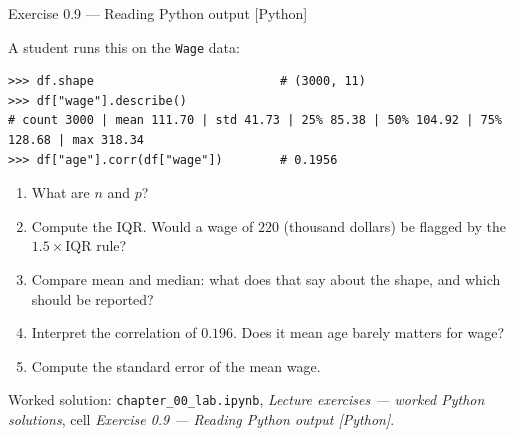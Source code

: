 \documentclass[aspectratio=169,11pt]{beamer}
\begin{document}
\begin{frame}[fragile]{Exercise 0.9 --- Reading Python output [Python]}
  \begin{exercise}
    \scriptsize
    A student runs this on the \texttt{Wage} data:
\begin{lstlisting}[basicstyle=\ttfamily\scriptsize,aboveskip=3pt,belowskip=1pt]
>>> df.shape                          # (3000, 11)
>>> df["wage"].describe()
# count 3000 | mean 111.70 | std 41.73 | 25% 85.38 | 50% 104.92 | 75% 128.68 | max 318.34
>>> df["age"].corr(df["wage"])        # 0.1956
\end{lstlisting}
    \begin{enumerate}
      \item What are $n$ and $p$?
      \item Compute the IQR. Would a wage of $220$ (thousand dollars) be
            flagged by the $1.5\times\mathrm{IQR}$ rule?
      \item Compare mean and median: what does that say about the shape,
            and which should be reported?
      \item Interpret the correlation of $0.196$. Does it mean age barely
            matters for wage?
      \item Compute the standard error of the mean wage.
    \end{enumerate}
  \end{exercise}
  \vspace{-5pt}
  \begin{labnote}
    \scriptsize Worked solution: \texttt{chapter\_00\_lab.ipynb}, \emph{Lecture
    exercises --- worked Python solutions}, cell \emph{Exercise 0.9 --- Reading
    Python output [Python]}.
  \end{labnote}
\end{frame}
\end{document}
